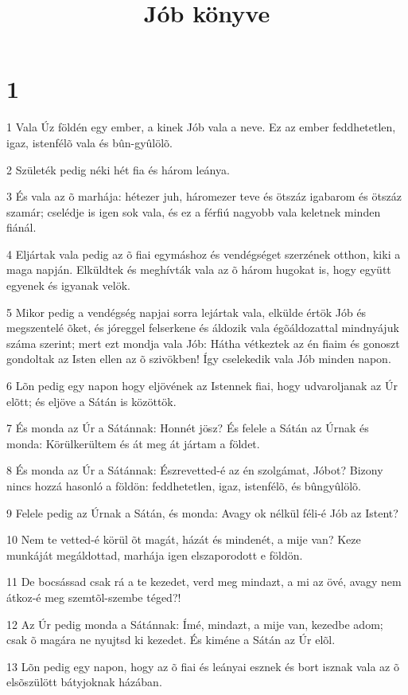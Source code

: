 

\title{Jób könyve}


\chapter{1}

\par 1 Vala Úz földén egy ember, a kinek Jób vala a neve. Ez az ember feddhetetlen, igaz, istenfélõ vala és bûn-gyûlölõ.
\par 2 Születék pedig néki hét fia és három leánya.
\par 3 És vala az õ marhája: hétezer juh, háromezer teve és ötszáz igabarom és ötszáz szamár; cselédje is igen sok vala, és ez a férfiú nagyobb vala keletnek minden fiánál.
\par 4 Eljártak vala pedig az õ fiai egymáshoz és vendégséget szerzének otthon, kiki a maga napján. Elküldtek és meghívták vala az õ három hugokat is, hogy együtt egyenek és igyanak velök.
\par 5 Mikor pedig a vendégség napjai sorra lejártak vala, elkülde értök Jób és megszentelé õket, és jóreggel felserkene és áldozik vala égõáldozattal mindnyájuk száma szerint; mert ezt mondja vala Jób: Hátha vétkeztek az én fiaim és gonoszt gondoltak az Isten ellen az õ szivökben! Így cselekedik vala Jób minden napon.
\par 6 Lõn pedig egy napon hogy eljövének az Istennek fiai, hogy udvaroljanak az Úr elõtt; és eljöve a Sátán is közöttök.
\par 7 És monda az Úr a Sátánnak: Honnét jösz? És felele a Sátán az Úrnak és monda: Körülkerültem és át meg át jártam a földet.
\par 8 És monda az Úr a Sátánnak: Észrevetted-é az én szolgámat, Jóbot? Bizony nincs hozzá hasonló a földön: feddhetetlen, igaz, istenfélõ, és bûngyûlölõ.
\par 9 Felele pedig az Úrnak a Sátán, és monda: Avagy ok nélkül féli-é Jób az Istent?
\par 10 Nem te vetted-é körül õt magát, házát és mindenét, a mije van? Keze munkáját megáldottad, marhája igen elszaporodott e földön.
\par 11 De bocsássad csak rá a te kezedet, verd meg mindazt, a mi az övé, avagy nem átkoz-é meg szemtõl-szembe téged?!
\par 12 Az Úr pedig monda a Sátánnak: Ímé, mindazt, a mije van, kezedbe adom; csak õ magára ne nyujtsd ki kezedet. És kiméne a Sátán az Úr elõl.
\par 13 Lõn pedig egy napon, hogy az õ fiai és leányai esznek és bort isznak vala az õ elsõszülött bátyjoknak házában.
